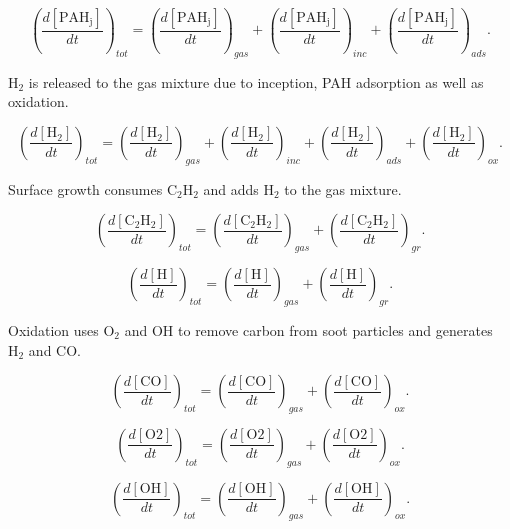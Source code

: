 \begin{equation}
	\left(
	\frac{d\left[{\mathrm{PAH_j}}\right]}{dt}
	\right)_{tot}
	= 
	\left(
	\frac{d\left[{\mathrm{PAH_j}}\right]}{dt}
	\right)_{gas}
	+
	\left(
	\frac{d\left[{\mathrm{PAH_j}}\right]}{dt}
	\right)_{inc}
	+
	\left(
	\frac{d\left[{\mathrm{PAH_j}}\right]}{dt}
	\right)_{ads}
	\label{eqn:PAHscrub_total}.
\end{equation}

$\mathrm{H_2}$ is released to the gas mixture due to inception, PAH adsorption as well as oxidation.

\begin{equation}
	\left(
	\frac{d\left[{\mathrm{H_2}}\right]}{dt}
	\right)_{tot}
	= 
	\left(
	\frac{d\left[{\mathrm{H_2}}\right]}{dt}
	\right)_{gas}
	+
	\left(
	\frac{d\left[{\mathrm{H_2}}\right]}{dt}
	\right)_{inc}
	+
	\left(
	\frac{d\left[{\mathrm{H_2}}\right]}{dt}
	\right)_{ads}
	+
	\left(
	\frac{d\left[{\mathrm{H_2}}\right]}{dt}
	\right)_{ox}
	\label{eqn:H2scrub_total}.
\end{equation}

Surface growth consumes $\mathrm{C_2H_2}$ and adds $\mathrm{H_2}$ to the gas mixture.

\begin{equation}
	\left(
	\frac{d\left[{\mathrm{C_2H_2}}\right]}{dt}
	\right)_{tot}
	= 
	\left(
	\frac{d\left[{\mathrm{C_2H_2}}\right]}{dt}
	\right)_{gas}
	+
	\left(
	\frac{d\left[{\mathrm{C_2H_2}}\right]}{dt}
	\right)_{gr}
	\label{eqn:C2H2scrub_total}.
\end{equation}


\begin{equation}
	\left(
	\frac{d\left[{\mathrm{H}}\right]}{dt}
	\right)_{tot}
	= 
	\left(
	\frac{d\left[{\mathrm{H}}\right]}{dt}
	\right)_{gas}
	+
	\left(
	\frac{d\left[{\mathrm{H}}\right]}{dt}
	\right)_{gr}
	\label{eqn:Hscrub_total}.
\end{equation}

Oxidation uses $\mathrm{O_2}$ and $\mathrm{OH}$ to remove carbon from soot particles and generates $\mathrm{H_2}$ and $\mathrm{CO}$.

\begin{equation}
	\left(
	\frac{
		d\left[
		\mathrm{CO}
		\right]
	}{dt}
	\right)_{tot}
	= 
	\left(
	\frac{d\left[{\mathrm{CO}}\right]}{dt}
	\right)_{gas}
	+
	\left(
	\frac{d\left[{\mathrm{CO}}\right]}{dt}
	\right)_{ox}
	\label{eqn:COscrub_total}.
\end{equation}

\begin{equation}
	\left(
	\frac{
		d\left[
		\mathrm{O2}
		\right]
	}{dt}
	\right)_{tot}
	= 
	\left(
	\frac{d\left[{\mathrm{O2}}\right]}{dt}
	\right)_{gas}
	+
	\left(
	\frac{d\left[{\mathrm{O2}}\right]}{dt}
	\right)_{ox}
	\label{eqn:O2scrub_total}.
\end{equation}

\begin{equation}
	\left(
	\frac{
		d\left[
		\mathrm{OH}
		\right]
	}{dt}
	\right)_{tot}
	= 
	\left(
	\frac{d\left[{\mathrm{OH}}\right]}{dt}
	\right)_{gas}
	+
	\left(
	\frac{d\left[{\mathrm{OH}}\right]}{dt}
	\right)_{ox}
	\label{eqn:OHscrub_total}.
\end{equation}



